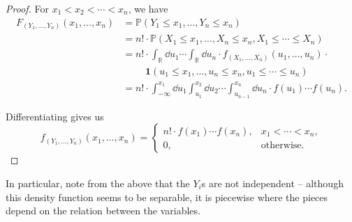 \documentclass[11pt]{article}
\numberwithin{equation}{section}
\theoremstyle{definition}
\theoremstyle{remark}
\newcommand{\pqty}[1]{\left(#1\right)}
\newcommand{\RR}{\mathbb R}
\newcommand{\minusinfty}{-\infty}
\newcommand{\indicator}{\mathbf 1}
\newcommand{\Prob}{\mathbb P}
\begin{document}
\begin{proof}\label{probability-proof-071}
    For \(x_1 < x_2 < \cdots < x_n\), we have
    \begin{align*}
        F_{\pqty{Y_1, \ldots, Y_n}} \pqty{x_1, \ldots, x_n} &= \Prob\pqty{Y_1 \leq x_1, \ldots, Y_n \leq x_n} \\
        &= n! \cdot \Prob\pqty{X_1 \leq x_1, \ldots, X_n \leq x_n, X_1 \leq \cdots \leq X_n} \\
        &= n! \cdot \int_{\RR} \dd{u_1} \cdots \int_{\RR} \dd{u_n} \cdot f_{\pqty{X_1, \ldots, X_n}} \pqty{u_1, \ldots, u_n} \cdot \\
        &\phantom{=} \quad \indicator \pqty{u_1 \leq x_1, \ldots, u_n \leq x_n, u_1 \leq \cdots \leq u_n} \\
        &= n! \cdot \int_{\minusinfty}^{x_1} \dd{u_1} \int_{u_1}^{x_2} \dd{u_2} \cdots \int_{u_{n - 1}}^{x_n} \dd{u_n} \cdot f\pqty{u_1} \cdots f\pqty{u_n}.
    \end{align*}

    Differentiating gives us
    \[
        f_{\pqty{Y_1, \ldots, Y_n}} \pqty{x_1, \ldots, x_n} = \begin{cases}
            n! \cdot f\pqty{x_1} \cdots f\pqty{x_n}, & x_1 < \cdots < x_n, \\
            0, & \text{otherwise}.
        \end{cases}
    \]
\end{proof}

In particular, note from the above that the \(Y_i\)s are not independent -- although this density function seems to be separable, it is piecewise where the pieces depend on the relation between the variables.
\end{document}
